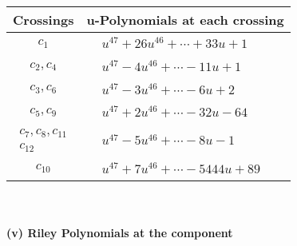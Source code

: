 \documentclass[1p]{elsarticle_modified}
\theoremstyle{definition}
\begin{document}
\begin{tabular}{m{50pt}|m{274pt}}
Crossings & \hspace{64pt}u-Polynomials at each crossing \\
\hline $$\begin{aligned}c_{1}\end{aligned}$$&$\begin{aligned}
&u^{47}+26 u^{46}+\cdots+33 u+1
\end{aligned}$\\
\hline $$\begin{aligned}c_{2},c_{4}\end{aligned}$$&$\begin{aligned}
&u^{47}-4 u^{46}+\cdots-11 u+1
\end{aligned}$\\
\hline $$\begin{aligned}c_{3},c_{6}\end{aligned}$$&$\begin{aligned}
&u^{47}-3 u^{46}+\cdots-6 u+2
\end{aligned}$\\
\hline $$\begin{aligned}c_{5},c_{9}\end{aligned}$$&$\begin{aligned}
&u^{47}+2 u^{46}+\cdots-32 u-64
\end{aligned}$\\
\hline $$\begin{aligned}c_{7},c_{8},c_{11}\\c_{12}\end{aligned}$$&$\begin{aligned}
&u^{47}-5 u^{46}+\cdots-8 u-1
\end{aligned}$\\
\hline $$\begin{aligned}c_{10}\end{aligned}$$&$\begin{aligned}
&u^{47}+7 u^{46}+\cdots-5444 u+89
\end{aligned}$\\
\hline
\end{tabular}\\~\\
\newpage\renewcommand{\arraystretch}{1}
\flushleft \textbf{(v) Riley Polynomials at the component}\newline \\
\end{document}
